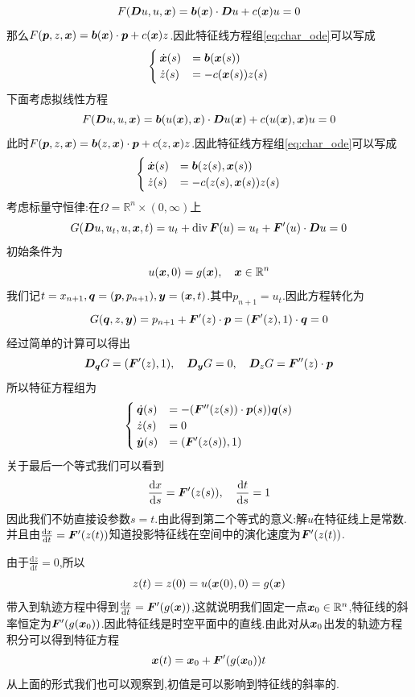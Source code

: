 $$
F(\bm{D}u,u,\bm{x})=\bm{b}(\bm{x})\cdot\bm{D}u+c(\bm{x})u=0
$$
那么$F(\bm{p},z,\bm{x})=\bm{b}(\bm{x})\cdot\bm{p}+c(\bm{x})z$.因此特征线方程组\eqref{eq:char_ode}可以写成
$$
\begin{cases}
    \dot{\bm{x}}(s)&=\bm{b}(\bm{x}(s))\\
    \dot{z}(s)&=-c(\bm{x}(s))z(s)
\end{cases}
$$
\qquad 下面考虑拟线性方程
$$
F(\bm{D}u,u,\bm{x})=\bm{b}(u(\bm{x}),\bm{x})\cdot\bm{D}u(\bm{x})+c(u(\bm{x}),\bm{x})u=0
$$
此时$F(\bm{p},z,\bm{x})=\bm{b}(z,\bm{x})\cdot\bm{p}+c(z,\bm{x})z$.因此特征线方程组\eqref{eq:char_ode}可以写成
$$
\begin{cases}
    \dot{\bm{x}}(s)&=\bm{b}(z(s),\bm{x}(s))\\
    \dot{z}(s)&=-c(z(s),\bm{x}(s))z(s)
\end{cases}
$$
\qquad 考虑标量守恒律:在$\Omega=\mathbb{R}^n\times (0,\infty)$上
$$
G(\bm{D}u,u_t,u,\bm{x},t)=u_t+\operatorname{div}\bm{F}(u)=u_t+\bm{F}'(u)\cdot\bm{D}u=0
$$
初始条件为
$$
u(\bm{x},0)=g(\bm{x}),\quad \bm{x}\in\mathbb{R}^n
$$
我们记$t=x_{n+1},\bm{q}=(\bm{p},p_{n+1}),\bm{y}=(\bm{x},t)$.其中$p_{n+1}=u_t$.因此方程转化为
$$
G(\bm{q},z,\bm{y})=p_{n+1}+\bm{F}'(z)\cdot\bm{p}=(\bm{F}'(z),1)\cdot\bm{q}=0
$$
经过简单的计算可以得出
$$
\bm{D}_{\bm{q}}G=(\bm{F}'(z),1),\quad \bm{D}_{\bm{y}}G=0,\quad \bm{D}_{z}G=\bm{F}''(z)\cdot\bm{p}
$$
所以特征方程组为
$$
\begin{cases}
    \dot{\bm{q}}(s)&=-(\bm{F}''(z(s))\cdot\bm{p}(s))\bm{q}(s)\\
    \dot{z}(s)&=0\\
    \dot{\bm{y}}(s)&=(\bm{F}'(z(s)),1)
\end{cases}
$$
关于最后一个等式我们可以看到
$$
\frac{\mathrm{d}x}{\mathrm{d}s}=\bm{F}'(z(s)),\quad \frac{\mathrm{d}t}{\mathrm{d}s}=1
$$
因此我们不妨直接设参数$s=t$.由此得到第二个等式的意义:解$u$在特征线上是常数.并且由$\frac{\mathrm{d}x}{\mathrm{d}t}=\bm{F}'(z(t))$知道投影特征线在空间中的演化速度为$\bm{F}'(z(t))$.\par
由于$\frac{\mathrm{d}z}{\mathrm{d}t}=0$,所以
$$
z(t)=z(0)=u(\bm{x}(0),0)=g(\bm{x})
$$
带入到轨迹方程中得到$\frac{\mathrm{d}x}{\mathrm{d}t}=\bm{F}'(g(\bm{x}))$,这就说明我们固定一点$\bm{x}_0\in\mathbb{R}^n$,特征线的斜率恒定为$\bm{F}'(g(\bm{x}_0))$.因此特征线是时空平面中的直线.由此对从$\bm{x}_0$出发的轨迹方程积分可以得到特征方程
$$
\bm{x}(t)=\bm{x}_0+\bm{F}'(g(\bm{x}_0))t
$$
从上面的形式我们也可以观察到,初值是可以影响到特征线的斜率的.\par
